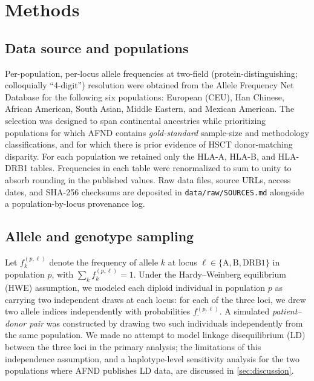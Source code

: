 \documentclass[11pt]{article}
\begin{document}
\section{Methods}
\label{sec:methods}

\subsection{Data source and populations}
Per-population, per-locus allele frequencies at two-field (protein-distinguishing; colloquially ``4-digit'') resolution were obtained from the Allele Frequency Net Database \citep{gonzalez2020afnd} for the following six populations: European (CEU), Han Chinese, African American, South Asian, Middle Eastern, and Mexican American. The selection was designed to span continental ancestries while prioritizing populations for which AFND contains \emph{gold-standard} sample-size and methodology classifications, and for which there is prior evidence of HSCT donor-matching disparity. For each population we retained only the HLA-A, HLA-B, and HLA-DRB1 tables. Frequencies in each table were renormalized to sum to unity to absorb rounding in the published values. Raw data files, source URLs, access dates, and SHA-256 checksums are deposited in \texttt{data/raw/SOURCES.md} alongside a population-by-locus provenance log.

\subsection{Allele and genotype sampling}
Let $f^{(p,\ell)}_k$ denote the frequency of allele $k$ at locus $\ell \in \{\text{A}, \text{B}, \text{DRB1}\}$ in population $p$, with $\sum_k f^{(p,\ell)}_k = 1$. Under the Hardy--Weinberg equilibrium (HWE) assumption, we modeled each diploid individual in population $p$ as carrying two independent draws at each locus: for each of the three loci, we drew two allele indices independently with probabilities $f^{(p,\ell)}_\cdot$. A simulated \emph{patient--donor pair} was constructed by drawing two such individuals independently from the same population. We made no attempt to model linkage disequilibrium (LD) between the three loci in the primary analysis; the limitations of this independence assumption, and a haplotype-level sensitivity analysis for the two populations where AFND publishes LD data, are discussed in \cref{sec:discussion}.
\end{document}
